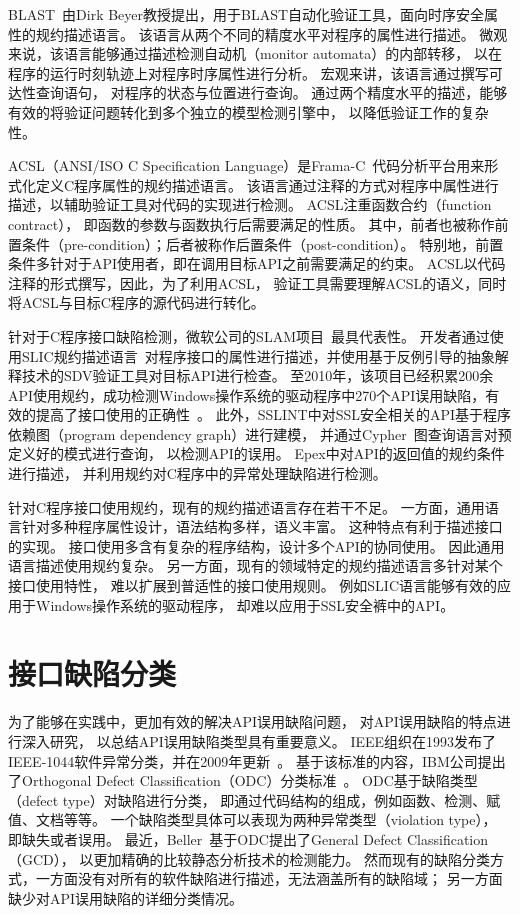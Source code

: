 BLAST~\cite{blast}由Dirk Beyer教授提出，用于BLAST自动化验证工具，面向时序安全属性的规约描述语言。
该语言从两个不同的精度水平对程序的属性进行描述。
微观来说，该语言能够通过描述检测自动机（monitor automata）的内部转移，
以在程序的运行时刻轨迹上对程序时序属性进行分析。
宏观来讲，该语言通过撰写可达性查询语句，
对程序的状态与位置进行查询。
通过两个精度水平的描述，能够有效的将验证问题转化到多个独立的模型检测引擎中，
以降低验证工作的复杂性。

ACSL（ANSI/ISO C Specification Language）是Frama-C~\cite{16-rv-framac}代码分析平台用来形式化定义C程序属性的规约描述语言。
该语言通过注释的方式对程序中属性进行描述，以辅助验证工具对代码的实现进行检测。
ACSL注重函数合约（function contract），
即函数的参数与函数执行后需要满足的性质。
其中，前者也被称作前置条件（pre-condition）；后者被称作后置条件（post-condition）。
特别地，前置条件多针对于API使用者，即在调用目标API之前需要满足的约束。
ACSL以代码注释的形式撰写，因此，为了利用ACSL，
验证工具需要理解ACSL的语义，同时将ACSL与目标C程序的源代码进行转化。


针对于C程序接口缺陷检测，微软公司的SLAM项目~\cite{slam}最具代表性。
开发者通过使用SLIC规约描述语言~\cite{01-slic}对程序接口的属性进行描述，并使用基于反例引导的抽象解释技术的SDV验证工具对目标API进行检查。
至2010年，该项目已经积累200余API使用规约，成功检测Windows操作系统的驱动程序中270个API误用缺陷，有效的提高了接口使用的正确性~\cite{10-cad-slam, 11-acm-slam}。
此外，SSLINT中对SSL安全相关的API基于程序依赖图（program dependency graph）进行建模，
并通过Cypher~\cite{18-sigmod-cypher}图查询语言对预定义好的模式进行查询，
以检测API的误用。
Epex中对API的返回值的规约条件进行描述，
并利用规约对C程序中的异常处理缺陷进行检测。

针对C程序接口使用规约，现有的规约描述语言存在若干不足。
一方面，通用语言针对多种程序属性设计，语法结构多样，语义丰富。
这种特点有利于描述接口的实现。
接口使用多含有复杂的程序结构，设计多个API的协同使用。
因此通用语言描述使用规约复杂。
另一方面，现有的领域特定的规约描述语言多针对某个接口使用特性，
难以扩展到普适性的接口使用规则。
例如SLIC语言能够有效的应用于Windows操作系统的驱动程序，
却难以应用于SSL安全裤中的API。


\section{接口缺陷分类}
\label{sec:2.3}
为了能够在实践中，更加有效的解决API误用缺陷问题，
对API误用缺陷的特点进行深入研究，
以总结API误用缺陷类型具有重要意义。
IEEE组织在1993发布了IEEE-1044软件异常分类，并在2009年更新~\cite{09-ieee-classification}。
基于该标准的内容，IBM公司提出了Orthogonal Defect Classification（ODC）分类标准~\cite{92-tse-odc}。
ODC基于缺陷类型（defect type）对缺陷进行分类，
即通过代码结构的组成，例如函数、检测、赋值、文档等等。
一个缺陷类型具体可以表现为两种异常类型（violation type），
即缺失或者误用。
最近，Beller~\cite{16-saner-evaluation}基于ODC提出了General Defect Classification（GCD），
以更加精确的比较静态分析技术的检测能力。
然而现有的缺陷分类方式，一方面没有对所有的软件缺陷进行描述，无法涵盖所有的缺陷域；
另一方面缺少对API误用缺陷的详细分类情况。

